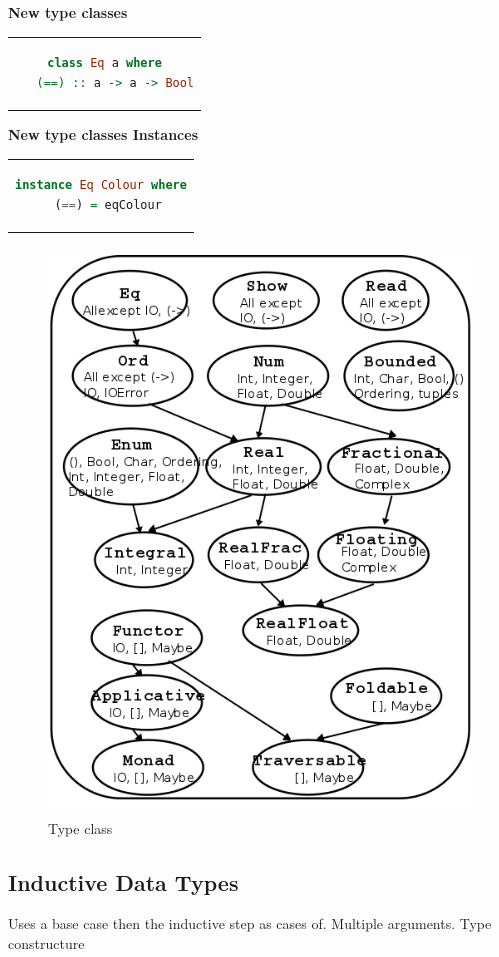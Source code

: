 \textbf{New type classes}
\begin{center}
\begin{tabular}{c}
\begin{lstlisting}[language=Haskell]
class Eq a where
   (==) :: a -> a -> Bool
\end{lstlisting}
\end{tabular}
\end{center}

\textbf{New type classes Instances}
\begin{center}
\begin{tabular}{c}
\begin{lstlisting}[language=Haskell]
instance Eq Colour where
  (==) = eqColour
\end{lstlisting}
\end{tabular}
\end{center}

\begin{figure}[H]
    \centering
    \includegraphics[width=15cm, height=15cm]{image/type-class.png} 
    \caption{Type class \cite{haskell}}
    \label{Type-class}
\end{figure}


\subsection{Inductive Data Types}
Uses a base case then the inductive step as cases of. Multiple arguments. Type constructure

